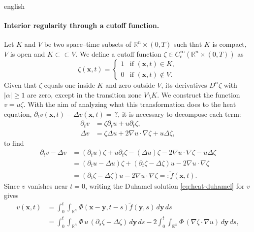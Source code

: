 \documentclass[11pt,letterpaper,twoside,openright]{book} %
\newcommand{\abs}[1]{\left\lvert #1 \right\rvert}
\begin{document}
\begin{hyphenrules}{english}
\paragraph{Interior regularity through a cutoff function.}
Let $K$ and $V$ be two
space--time subsets of $\mathbb{R}^n\times(0,T)$ such that $K$ is compact, $V$ is open and $K\subset\subset V$.
We define a cutoff function $\zeta\in C_c^\infty(\mathbb{R}^n\times(0,T))$ as
\begin{equation}
  \zeta(\mathbf{x},t)=
  \begin{cases}
    1 & \text{if } (\mathbf{x},t)\in K,\\
    0 & \text{if } (\mathbf{x},t)\notin V.
  \end{cases}
  \label{eq:cutoff}
\end{equation}
Given that $\zeta$ equals one inside $K$ and zero outside $V$, its derivatives $D^\alpha\zeta$ with
$\abs{\alpha}\ge1$ are zero, except in the transition zone $V\setminus K$. We construct the function
$v=u\zeta$. With the aim of analyzing what this transformation does to the heat equation,
$\partial_t v(\mathbf{x},t)-\Delta v(\mathbf{x},t)=\,?$, it is necessary to decompose each term:
\begin{align}
  \partial_t v&=\zeta\partial_t u+u\partial_t\zeta, \label{eq:cut-dt}\\
  \Delta v&=\zeta\Delta u+2\nabla u\cdot\nabla\zeta+u\Delta\zeta, \label{eq:cut-lap}
\end{align}
to find
\begin{align}
  \partial_t v-\Delta v
    &=(\partial_t u)\zeta+u\partial_t\zeta-(\Delta u)\zeta-2\nabla u\cdot\nabla\zeta-u\Delta\zeta \label{eq:cut-1}\\
    &=(\partial_t u-\Delta u)\zeta+(\partial_t\zeta-\Delta\zeta)u-2\nabla u\cdot\nabla\zeta \label{eq:cut-2}\\
    &=(\partial_t\zeta-\Delta\zeta)u-2\nabla u\cdot\nabla\zeta=:\tilde f(\mathbf{x},t). \label{eq:cut-3}
\end{align}
Since $v$ vanishes near $t=0$, writing the Duhamel solution \eqref{eq:heat-duhamel} for $v$ gives
\begin{align}
  v(\mathbf{x},t)&=\int_0^t\!\!\int_{\mathbb{R}^n}\Phi(\mathbf{x}-\mathbf{y},t-s)\tilde f(\mathbf{y},s)\,d\mathbf{y}\,d s \label{eq:cut-4}\\
         &=\int_0^t\!\!\int_{\mathbb{R}^n}\Phi\,u\,(\partial_s\zeta-\Delta\zeta)\,d\mathbf{y}\,d s
           -2\int_0^t\!\!\int_{\mathbb{R}^n}\Phi\,(\nabla\zeta\cdot\nabla u)\,d\mathbf{y}\,d s, \label{eq:cut-5}

\end{align}
\end{hyphenrules}
\end{document}
